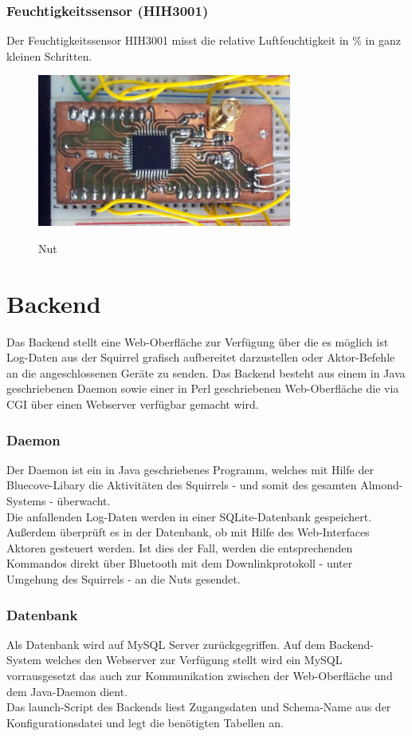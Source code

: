 \documentclass[12pt,a4paper]{article}
\begin{document}
		\subsubsection{Feuchtigkeitssensor (HIH3001)}
		Der Feuchtigkeitssensor HIH3001 misst die relative Luftfeuchtigkeit in \% in ganz kleinen Schritten. 

		\begin{figure}[h]
		\includegraphics[height=5cm]{nut_shot1.png} 
		\label{fig:2}
		\caption{Nut}
		\end{figure}

		
\section{Backend}
Das Backend stellt eine Web-Oberfläche zur Verfügung über die es möglich ist Log-Daten aus der Squirrel grafisch aufbereitet darzustellen oder Aktor-Befehle an die angeschlossenen Geräte zu senden. Das Backend besteht aus einem in Java geschriebenen Daemon sowie einer in Perl geschriebenen Web-Oberfläche die via CGI über einen Webserver verfügbar gemacht wird.

\subsubsection{Daemon}
Der Daemon ist ein in Java geschriebenes Programm, welches mit Hilfe der Bluecove-Libary die Aktivitäten des Squirrels - und somit des gesamten Almond-Systems - überwacht.\\
Die anfallenden Log-Daten werden in einer SQLite-Datenbank gespeichert.\\
Außerdem überprüft es in der Datenbank, ob mit Hilfe des Web-Interfaces Aktoren gesteuert werden. Ist dies der Fall, werden die entsprechenden Kommandos direkt über Bluetooth mit dem Downlinkprotokoll - unter Umgehung des Squirrels - an die Nuts gesendet.\\

\subsubsection{Datenbank}
Als Datenbank wird auf MySQL Server zurückgegriffen. Auf dem Backend-System welches den Webserver zur Verfügung stellt wird ein MySQL vorrausgesetzt das auch zur Kommunikation zwischen der Web-Oberfläche und dem Java-Daemon dient. \\
Das launch-Script des Backends liest Zugangsdaten und Schema-Name aus der Konfigurationsdatei und legt die benötigten Tabellen an.
\end{document}
